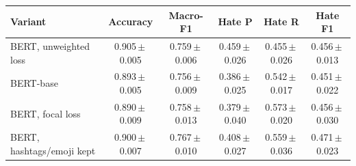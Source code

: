\begin{tabular}{lccccc}
\toprule
Variant & Accuracy & Macro-F1 & Hate P & Hate R & Hate F1 \\
\midrule
BERT, unweighted loss & 0.905\,$\pm$\,0.005 & 0.759\,$\pm$\,0.006 & 0.459\,$\pm$\,0.026 & 0.455\,$\pm$\,0.026 & 0.456\,$\pm$\,0.013 \\
BERT-base & 0.893\,$\pm$\,0.005 & 0.756\,$\pm$\,0.009 & 0.386\,$\pm$\,0.025 & 0.542\,$\pm$\,0.017 & 0.451\,$\pm$\,0.022 \\
BERT, focal loss & 0.890\,$\pm$\,0.009 & 0.758\,$\pm$\,0.013 & 0.379\,$\pm$\,0.040 & 0.573\,$\pm$\,0.020 & 0.456\,$\pm$\,0.030 \\
BERT, hashtags/emoji kept & 0.900\,$\pm$\,0.007 & 0.767\,$\pm$\,0.010 & 0.408\,$\pm$\,0.027 & 0.559\,$\pm$\,0.036 & 0.471\,$\pm$\,0.023 \\
\bottomrule
\end{tabular}
